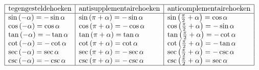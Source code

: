 \documentclass[a5paper]{article}
\begin{document}
{\[
\begin{array}{|l|l|l|}
\hline
\text{tegengesteldehoeken} & \text{antisupplementairehoeken} & \text{anticomplementairehoeken} \\
\hline
\sin{\left(-\alpha\right)} = -\sin{\alpha} & \sin{\left(\pi + \alpha\right)} = -\sin{\alpha} & \sin{\left(\frac{\pi}{2} + \alpha\right)} = \cos{\alpha} \\
\cos{\left(-\alpha\right)} = \cos{\alpha} & \cos{\left(\pi + \alpha\right)} = -\cos{\alpha} & \cos{\left(\frac{\pi}{2} + \alpha\right)} = -\sin{\alpha} \\
\tan{\left(-\alpha\right)} = -\tan{\alpha} & \tan{\left(\pi + \alpha\right)} = \tan{\alpha} & \tan{\left(\frac{\pi}{2} + \alpha\right)} = -\cot{\alpha} \\
\cot{\left(-\alpha\right)} = -\cot{\alpha} & \cot{\left(\pi + \alpha\right)} = \cot{\alpha} & \cot{\left(\frac{\pi}{2} + \alpha\right)} = -\tan{\alpha} \\
\sec{\left(-\alpha\right)} = \sec{\alpha} & \sec{\left(\pi + \alpha\right)} = -\sec{\alpha} & \sec{\left(\frac{\pi}{2} + \alpha\right)} = -\csc{\alpha} \\
\csc{\left(-\alpha\right)} = -\csc{\alpha} & \csc{\left(\pi + \alpha\right)} = -\csc{\alpha} & \csc{\left(\frac{\pi}{2} + \alpha\right)} = \sec{\alpha} \\
\hline
\end{array}
\]

\newpage

}
\end{document}
